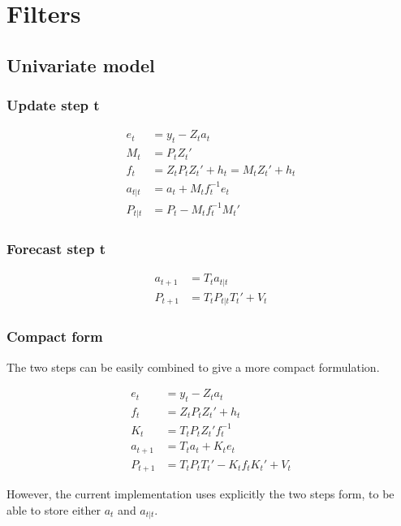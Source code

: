 \documentclass[
  letterpaper,
  DIV=11,
  numbers=noendperiod]{scrreprt}
\begin{document}
\section{Filters}\label{filters}

\subsection{Univariate model}\label{univariate-model}

\subsubsection{Update step t}\label{update-step-t}

\[
\begin{align*}
e_t &= y_t - Z_t a_t \\
M_t &= P_t Z_t' \\
f_t &= Z_t P_t Z_t' +h_t = M_tZ_t' + h_t \\
a_{t|t} &= a_t + M_t f_t^{-1}e_t \\
P_{t|t}&= P_t - M_t f_t^{-1} M_t'
\end{align*}
\]

\subsubsection{Forecast step t}\label{forecast-step-t}

\[
\begin{align*}
a_{t+1} &= T_t a_{t|t} \\
P_{t+1} &= T_t P_{t|t} T_t' + V_t
\end{align*}
\]

\subsubsection{Compact form}\label{compact-form}

The two steps can be easily combined to give a more compact formulation.

\[
\begin{align*}
e_t &= y_t - Z_t a_t \\
f_t &= Z_t P_t Z_t' + h_t \\
K_t &= T_t P_t Z_t' f_t^{-1} \\
a_{t+1} &= T_t a_t + K_t e_t \\
P_{t+1} &= T_t P_t T_t' - K_t f_t K_t' + V_t
\end{align*}
\]

However, the current implementation uses explicitly the two steps form,
to be able to store either \(a_t\) and \(a_{t|t}\).
\end{document}
